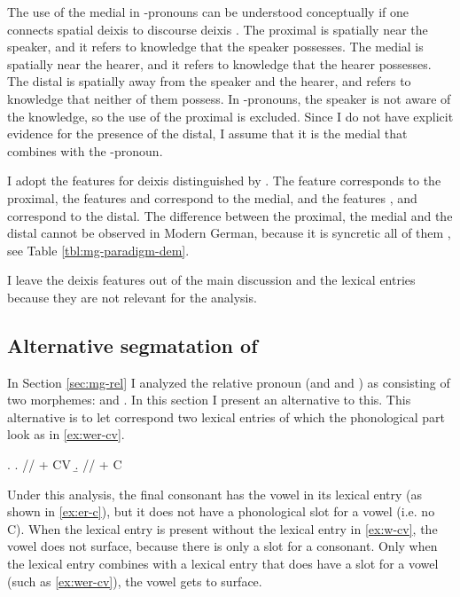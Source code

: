 The use of the medial in -pronouns can be understood conceptually if one connects spatial deixis to discourse deixis \citep[cf.][]{colasanti2019}. The proximal is spatially near the speaker, and it refers to knowledge that the speaker possesses. The medial is spatially near the hearer, and it refers to knowledge that the hearer possesses. The distal is spatially away from the speaker and the hearer, and refers to knowledge that neither of them possess. In -pronouns, the speaker is not aware of the knowledge, so the use of the proximal is excluded. Since I do not have explicit evidence for the presence of the distal, I assume that it is the medial that combines with the -pronoun.

I adopt the features for deixis distinguished by \citet{lander2018}. The feature  corresponds to the proximal, the features  and  correspond to the medial, and the features ,  and  correspond to the distal.
The difference between the proximal, the medial and the distal cannot be observed in Modern German, because it is syncretic all of them , see Table \ref{tbl:mg-paradigm-dem}.

I leave the deixis features out of the main discussion and the lexical entries because they are not relevant for the analysis.

\subsection{Alternative segmatation of }\label{sec:mg-w-er-cv}

In Section \ref{sec:mg-rel} I analyzed the relative pronoun  (and  and ) as consisting of two morphemes:  and . In this section I present an alternative to this. This alternative is to let  correspond two lexical entries of which the phonological part look as in \ref{ex:wer-cv}.

\ex.\label{ex:wer-cv}
\a.\label{ex:w-cv} // + CV
\b.\label{ex:er-c} // + C

Under this analysis, the final consonant has the vowel  in its lexical entry (as shown in \ref{ex:er-c}), but it does not have a phonological slot for a vowel (i.e. no C). When the lexical entry is present without the lexical entry in \ref{ex:w-cv}, the vowel  does not surface, because there is only a slot for a consonant. Only when the lexical entry combines with a lexical entry that does have a slot for a vowel (such as \ref{ex:wer-cv}), the vowel  gets to surface.

